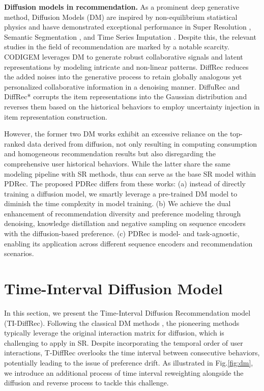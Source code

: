\documentclass[letterpaper]{article} %
\begin{document}
\noindent
\textbf{Diffusion models in recommendation.}
As a prominent deep generative method, Diffusion Models (DM) are inspired by non-equilibrium statistical physics and hasve demonstrated exceptional performance in Super Resolution \cite{SR_v1, SR_v2}, Semantic Segmentation \cite{SS_v1}, and Time Series Imputation \cite{TSL_v2}. Despite this, the relevant studies in the field of recommendation are marked by a notable scarcity. CODIGEM \cite{CODIGEM} leverages DM to generate robust collaborative signals and latent representations by modeling intricate and non-linear patterns. DiffRec \cite{DiffRec} reduces the added noises into the generative process to retain globally analogous yet personalized collaborative information in a denoising manner. DiffuRec \cite{DiffuRec} and DiffRec* \cite{DiffRec*} corrupts the item representations into the Gaussian distribution and reverses them based on the historical behaviors to employ uncertainty injection in item representation construction.

However, the former two DM works exhibit an excessive reliance on the top-ranked data derived from diffusion, not only resulting in computing consumption and homogeneous recommendation results but also disregarding the comprehensive user historical behaviors.
While the latter share the same modeling pipeline with SR methods, thus can serve as the base SR model within PDRec. The proposed PDRec differs from these works: (a) instead of directly training a diffusion model, we smartly leverage a pre-trained DM model to diminish the time complexity in model training. (b) We achieve the dual enhancement of recommendation diversity and preference modeling through denoising, knowledge distillation and negative sampling on sequence encoders with the diffusion-based preference. (c) PDRec is model- and task-agnostic, enabling its application across different sequence encoders and recommendation scenarios.



\section{Time-Interval Diffusion Model}
\label{sec.TI-DiffRec}
In this section, we present the Time-Interval Diffusion Recommendation model (TI-DiffRec). Following the classical DM methods \cite{DDPM, IDDPM}, the pioneering methods \cite{CODIGEM, DiffRec} typically leverage the original interaction matrix for diffusion, which is challenging to apply in SR. Despite incorporating the temporal order of user interactions, T-DiffRec \cite{DiffRec} overlooks the time interval between consecutive behaviors, potentially leading to the issue of preference drift. As illustrated in Fig.\ref{fig:dm}, we introduce an additional process of time interval reweighting alongside the diffusion and reverse process to tackle this challenge.
\end{document}
